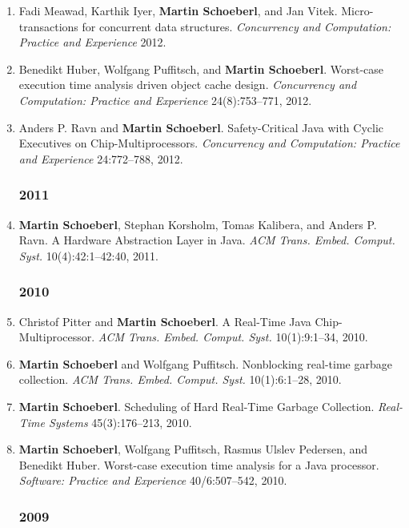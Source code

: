 \begin{enumerate}
\item Fadi Meawad, Karthik Iyer, {\bf Martin Schoeberl}, and Jan Vitek.
 Micro-transactions for concurrent data structures.
 \emph{Concurrency and Computation: Practice and Experience} 2012.

\item Benedikt Huber, Wolfgang Puffitsch, and {\bf Martin Schoeberl}.
 Worst-case execution time analysis driven object cache design.
 \emph{Concurrency and Computation: Practice and Experience} 24(8):753--771, 2012.

\item Anders P. Ravn and {\bf Martin Schoeberl}.
 Safety-Critical Java with Cyclic Executives on Chip-Multiprocessors.
 \emph{Concurrency and Computation: Practice and Experience} 24:772--788, 2012.


\subsubsection*{2011}

\item {\bf Martin Schoeberl}, Stephan Korsholm, Tomas Kalibera, and Anders P. Ravn.
 A Hardware Abstraction Layer in Java.
 \emph{ACM Trans. Embed. Comput. Syst.} 10(4):42:1--42:40, 2011.


\subsubsection*{2010}

\item Christof Pitter and {\bf Martin Schoeberl}.
 A Real-Time Java Chip-Multiprocessor.
 \emph{ACM Trans. Embed. Comput. Syst.} 10(1):9:1--34, 2010.

\item {\bf Martin Schoeberl} and Wolfgang Puffitsch.
 Nonblocking real-time garbage collection.
 \emph{ACM Trans. Embed. Comput. Syst.} 10(1):6:1--28, 2010.

\item {\bf Martin Schoeberl}.
 Scheduling of Hard Real-Time Garbage Collection.
 \emph{Real-Time Systems} 45(3):176--213, 2010.

\item {\bf Martin Schoeberl}, Wolfgang Puffitsch, Rasmus Ulslev Pedersen, and Benedikt Huber.
 Worst-case execution time analysis for a Java processor.
 \emph{Software: Practice and Experience} 40/6:507--542, 2010.


\subsubsection*{2009}


\end{enumerate}
